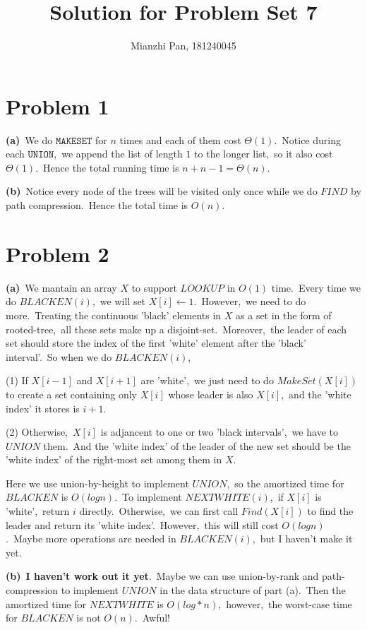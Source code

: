 \documentclass[]{article}
\title{Solution for Problem Set 7}
\author{Mianzhi Pan, 181240045}
\begin{document}
	\maketitle
	\section{Problem 1}
	\textbf{(a)}\ We do $\mathtt{MAKESET}$ for $n$ times and each of them cost $\Theta(1)$.\ Notice during each $\mathtt{UNION}$,\ we append the list of length $1$ to the longer list,\ so it also cost $\Theta(1)$.\ Hence the total running time is $n + n - 1 = \Theta(n)$.
	
	\textbf{(b)}\ Notice every node of the trees will be visited only once while we do $FIND$ by path compression.\ Hence the total time is $O(n)$. 
	
	\section{Problem 2}
	\textbf{(a)}\ We mantain an array $X$ to support $LOOKUP$ in $O(1)$ time.\ Every time we do $BLACKEN(i)$,\ we will set $X[i]\leftarrow 1$.\ However,\ we need to do more.\ Treating the continuous 'black' elements in $X$ as a set in the form of rooted-tree,\ all these sets make up a disjoint-set.\ Moreover,\ the leader of each set should store the index of the first 'white' element after the 'black' interval'.\ So when we do $BLACKEN(i)$,\ 
	
	(1) If $X[i-1]$ and $X[i+1]$ are 'white',\ we just need to do $MakeSet(X[i])$ to create a set containing only $X[i]$ whose leader is also $X[i]$,\ and the 'white index' it stores is $i+1$.
	
	(2) Otherwise,\ $X[i]$ is adjancent to one or two 'black intervals',\ we have to $UNION$ them.\ And the 'white index' of the leader of the new set should be the 'white index' of the right-most set among them in $X$. 
	
	Here we use union-by-height to implement $UNION$,\ so the amortized time for $BLACKEN$ is $O(logn)$.\ To implement $NEXTWHITE(i)$,\ if $X[i]$ is 'white',\ return $i$ directly.\ Otherwise,\ we can first call $Find(X[i])$ to find the leader and return its 'white index'.\ However,\ this will still cost $O(logn)$.\ Maybe more operations are needed in $BLACKEN(i)$,\ but I haven't make it yet.
	
	\textbf{(b)}\ \textbf{I haven't work out it yet}.\ Maybe we can use union-by-rank and path-compression to implement $UNION$ in the data structure of part (a).\ Then the amortized time for $NEXTWHITE$ is $O(log*n)$,\ however,\ the worst-case time for $BLACKEN$ is not $O(n)$.\ Awful!
\end{document}
